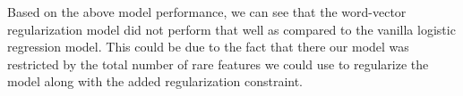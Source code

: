 Based on the above model performance, we can see that the word-vector regularization model did not perform that well as compared to the vanilla logistic regression model. This could be due to the fact that there our model was restricted by the total number of rare features we could use to regularize the model along with the added regularization constraint.
